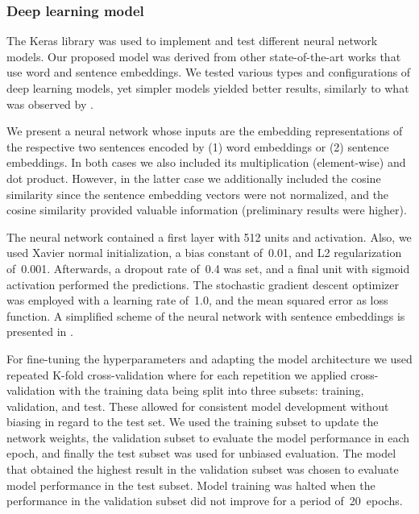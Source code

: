 \subsubsection{Deep learning model}

The Keras library \parencite{chollet2015a} was used to implement and test different neural network models.
Our proposed model was derived from other state-of-the-art works \parencite{chen2019g,chen2018d} that use word and sentence embeddings.
We tested various types and configurations of deep learning models, yet simpler models yielded better results, similarly to what was observed by \textcite{chen2019g}.

We present a neural network whose inputs are the embedding representations of the respective two sentences encoded by (1) word embeddings or (2) sentence embeddings.
In both cases we also included its multiplication (element-wise) and dot product.
However, in the latter case we additionally included the cosine similarity since the sentence embedding vectors were not normalized, and the cosine similarity provided valuable information (preliminary results were higher).

The neural network contained a first layer with 512 units and  activation.
Also, we used Xavier normal initialization, a bias constant of~0.01, and L2 regularization of~0.001.
Afterwards, a dropout rate of~0.4 was set, and a final unit with sigmoid activation performed the predictions.
The stochastic gradient descent optimizer was employed with a learning rate of~1.0, and the mean squared error as loss function.
A simplified scheme of the neural network with sentence embeddings is presented in \mbox{}.



For fine-tuning the hyperparameters and adapting the model architecture we used repeated K-fold cross-validation where for each repetition we applied cross-validation with the training data being split into three subsets: training, validation, and test.
These allowed for consistent model development without biasing in regard to the test set.
We used the training subset to update the network weights, the validation subset to evaluate the model performance in each epoch, and finally the test subset was used for unbiased evaluation.
The model that obtained the highest result in the validation subset was chosen to evaluate model performance in the test subset.
Model training was halted when the performance in the validation subset did not improve for a period of~20~epochs.

